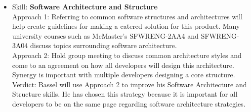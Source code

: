 \documentclass[12pt]{article}
\begin{document}
\begin{itemize}
		\item Skill: \textbf{Software Architecture and Structure}
		\\ Approach 1: Referring to common software structures and architectures will help create guidelines for making a catered solution for this product. Many university courses such as McMaster's SFWRENG-2AA4 and SFWRENG-3A04 discuss topics surrounding software architecture.
		\\ Approach 2: Hold group meeting to discuss common architecture styles and come to an agreement on how all developers will design this architecture. Synergy is important with multiple developers designing a core structure.
		\\ Verdict: Bassel will use Approach 2 to improve his Software Architecture and Structure skills. He has chosen this strategy because it is important for all developers to be on the same page regarding software architecture strategies.
	\end{itemize}
	
\end{document}
